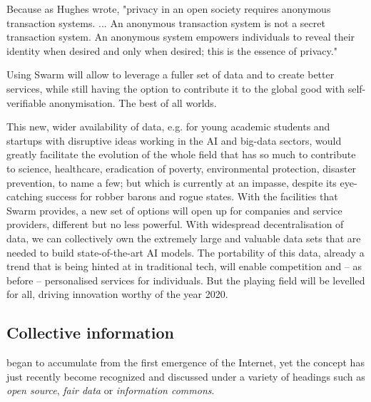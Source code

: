Because as Hughes wrote, "privacy in an open society requires anonymous transaction systems. ... An anonymous transaction system is not a secret transaction system. An anonymous system empowers individuals to reveal their identity when desired and only when desired; this is the essence of privacy."

Using Swarm will allow to leverage a fuller set of data and to create better services, while still having the option to contribute it to the global good with self-verifiable anonymisation. The best of all worlds.

This new, wider availability of data, e.g. for young academic students and startups with disruptive ideas working in the AI and big-data sectors, would greatly facilitate the evolution of the whole field that has so much to contribute to science, healthcare, eradication of poverty, environmental protection, disaster prevention, to name a few; but which is currently at an impasse, despite its eye-catching success for robber barons and rogue states. With the facilities that Swarm provides, a new set of options will open up for companies and service providers, different but no less powerful. With widespread decentralisation of data, we can collectively own the extremely large and valuable data sets that are needed to build state-of-the-art AI models. The portability of this data, already a trend that is being hinted at in traditional tech, will enable competition and – as before – personalised services for individuals. But the playing field will be levelled for all, driving innovation worthy of the year 2020. 



\subsection{Collective information \statusgreen}\label{sec:collective_information}

 began to accumulate from the first emergence of the Internet, yet the concept has just recently become recognized and discussed under a variety of headings such as  \emph{open source}, \emph{fair data} or \emph{information commons}.

